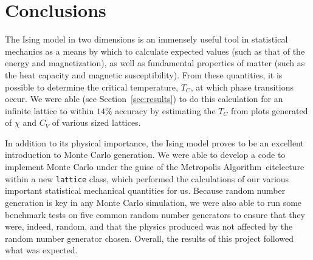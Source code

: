 \documentclass[12pt]{article}
\numberwithin{equation}{section}
\begin{document}
\section{Conclusions}
\label{sec:conc}

The Ising model in two dimensions is an immensely useful tool in statistical mechanics as a means by which to calculate expected values (such as that of the energy and magnetization), as well as fundamental properties of matter (such as the heat capacity and magnetic susceptibility).  From these quantities, it is possible to determine the critical temperature, $T_{C}$, at which phase transitions occur.  We were able (see Section~\ref{sec:results}) to do this calculation for an infinite lattice to within $14\%$ accuracy by estimating the $T_{C}$ from plots generated of $\chi$ and $C_{V}$ of various sized lattices.
\par In addition to its physical importance, the Ising model proves to be an excellent introduction to Monte Carlo generation.  We were able to develop a code to implement Monte Carlo under the guise of the Metropolis Algorithm~cite{lecture} within a new \texttt{lattice} class, which performed the calculations of our various important statistical mechanical quantities for us.  Because random number generation is key in any Monte Carlo simulation, we were also able to run some benchmark tests on five common random number generators to ensure that they were, indeed, random, and that the physics produced was not affected by the random number generator chosen.  Overall, the results of this project followed what was expected.



\end{document}
